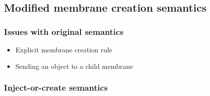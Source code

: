 
  \subsection{Modified membrane creation semantics} %
  \label{sub:modified_membrane_creation_semantics}

    \begin{frame}[t]\frametitle{Issues with original semantics}
      \begin{itemize}
        \item Explicit membrane creation rule
        \item Sending an object to a child membrane
      \end{itemize}
    \end{frame}
    \note{}


    \begin{frame}[t]\frametitle{Inject-or-create semantics}
      \begin{columns}
        \begin{column}{0.5\textwidth}
          \vspace{-20pt}
          \vspace{-20pt}
          \begin{figure}
            \def\svgwidth{150pt}
          \end{figure}
          \vspace{-20pt}
        \end{column}
        \begin{column}{0.5\textwidth}
          \vspace{-30pt}
          \begin{figure}
            \def\svgwidth{150pt}
          \end{figure}
          \vspace{-30pt}
          \begin{figure}
            \def\svgwidth{150pt}
          \end{figure}    
        \end{column}
      \end{columns}
    \end{frame}
    \note{}


